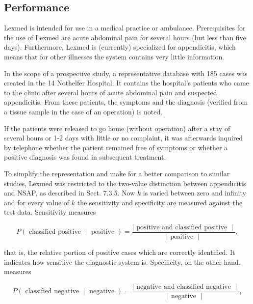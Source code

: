 \documentclass[10pt]{book}
\begin{document}
\subsection{Performance}
Lexmed is intended for use in a medical practice or ambulance. Prerequisites for the use of Lexmed are acute abdominal pain for several hours (but less than five days). Furthermore, Lexmed is (currently) specialized for appendicitis, which means that for other illnesses the system contains very little information.

In the scope of a prospective study, a representative database with 185 cases was created in the 14 Nothelfer Hospital. It contains the hospital's patients who came to the clinic after several hours of acute abdominal pain and suspected appendicitis. From these patients, the symptoms and the diagnosis (verified from a tissue sample in the case of an operation) is noted.

If the patients were released to go home (without operation) after a stay of several hours or 1-2 days with little or no complaint, it was afterwards inquired by telephone whether the patient remained free of symptoms or whether a positive diagnosis was found in subsequent treatment.

To simplify the representation and make for a better comparison to similar studies, Lexmed was restricted to the two-value distinction between appendicitis and NSAP, as described in Sect. 7.3.5. Now $k$ is varied between zero and infinity\\
and for every value of $k$ the sensitivity and specificity are measured against the test data. Sensitivity measures

\begin{equation*}
P(\text { classified positive } \mid \text { positive })=\frac{\mid \text { positive and classified positive } \mid}{\mid \text { positive } \mid}, \tag{7.16}
\end{equation*}

that is, the relative portion of positive cases which are correctly identified. It indicates how sensitive the diagnostic system is. Specificity, on the other hand, measures

\begin{equation*}
P(\text { classified negative } \mid \text { negative })=\frac{\mid \text { negative and classified negative } \mid}{\mid \text { negative } \mid}, \tag{7.17}
\end{equation*}
\end{document}
